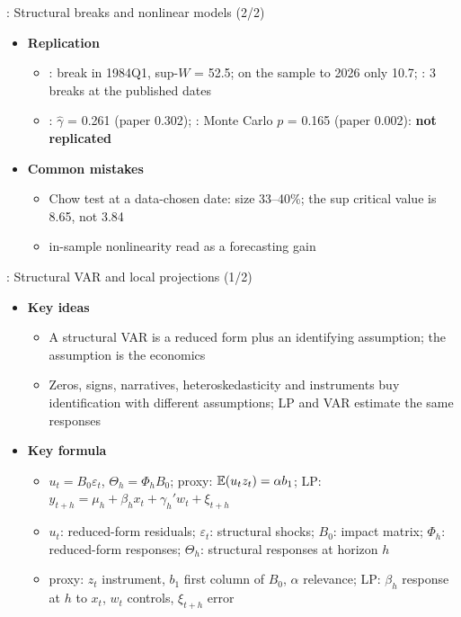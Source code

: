 \begin{frame}{: Structural breaks and nonlinear models (2/2)}
\itemsize{\small}
\begin{itemize}
    \item \textbf{Replication}
    \begin{itemize}
        \item {}: break in 1984Q1, sup-$W$ = 52.5; on the sample to 2026 only 10.7; : 3 breaks at the published dates
        \item {}: $\hat\gamma$ = 0.261 (paper 0.302); : Monte Carlo $p$ = 0.165 (paper 0.002): \textbf{not replicated}
    \end{itemize}
    \item \textbf{Common mistakes}
    \begin{itemize}
        \item Chow test at a data-chosen date: size 33--40\%; the sup critical value is 8.65, not 3.84
        \item in-sample nonlinearity read as a forecasting gain
    \end{itemize}
\end{itemize}
\end{frame}

\begin{frame}{: Structural VAR and local projections (1/2)}
\itemsize{\footnotesize}
\begin{itemize}
    \item \textbf{Key ideas}
    \begin{itemize}
        \item A structural VAR is a reduced form plus an identifying assumption; the assumption is the economics
        \item Zeros, signs, narratives, heteroskedasticity and instruments buy identification with different assumptions; LP and VAR estimate the same responses
    \end{itemize}
    \item \textbf{Key formula}
    \begin{itemize}
        \item $u_t = B_0\varepsilon_t$, $\Theta_h = \Phi_hB_0$; proxy: $\mathbb{E}(u_tz_t) = \alpha b_1$; LP: $y_{t+h} = \mu_h + \beta_hx_t + \gamma_h'w_t + \xi_{t+h}$
        \item $u_t$: reduced-form residuals; $\varepsilon_t$: structural shocks; $B_0$: impact matrix; $\Phi_h$: reduced-form responses; $\Theta_h$: structural responses at horizon $h$
        \item proxy: $z_t$ instrument, $b_1$ first column of $B_0$, $\alpha$ relevance; LP: $\beta_h$ response at $h$ to $x_t$, $w_t$ controls, $\xi_{t+h}$ error
    \end{itemize}
\end{itemize}
\end{frame}

